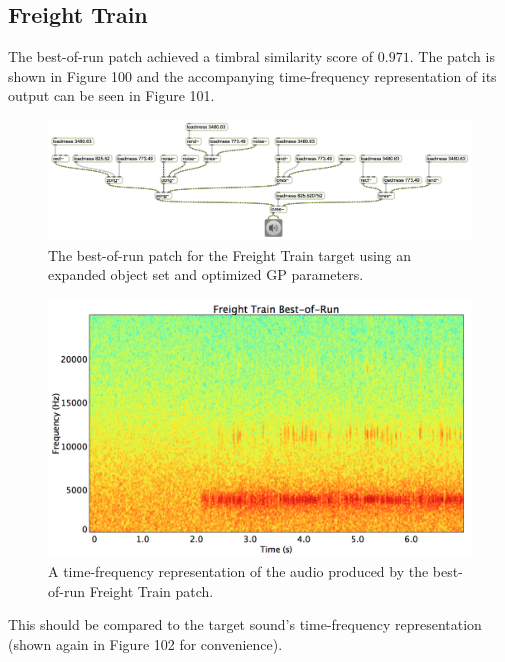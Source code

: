\documentclass[12pt]{report} 	%
\numberwithin{figure}{chapter}
\numberwithin{table}{chapter}
\numberwithin{equation}{chapter}
\begin{document}
\begin{flushleft}
\vspace{12pt}
\subsection{Freight Train}
The best-of-run patch achieved a timbral similarity score of $0.971$. The patch is shown in Figure 100 and the accompanying time-frequency representation of its output can be seen in Figure 101.
\begin{figure}[h!]
\begin{center}
\includegraphics[angle=270, scale=0.52]{FreightTrain_Best}
\caption[Freight train best-of-run patch]{The best-of-run patch for the Freight Train target using an expanded object set and optimized GP parameters.}
\end{center}
\end{figure}
\begin{figure}[h!]
\begin{center}
\includegraphics[scale=0.34]{FreightTrainBestOfRunSTFT}
\caption[Best-of-run freight train time-frequency representation]{A time-frequency representation of the audio produced by the best-of-run Freight Train patch.}
\end{center}
\vspace{12pt}
\end{figure}
This should be compared to the target sound's time-frequency representation (shown again in Figure 102 for convenience).

\end{flushleft}
\end{document}
